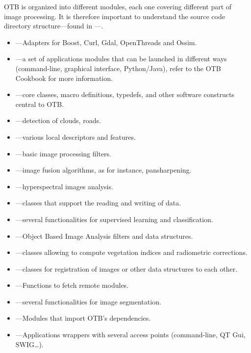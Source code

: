 OTB is organized into different modules, each one covering different part of image processing.
It is therefore important to understand the source code directory structure---found in ---.
\begin{itemize}
  \item {}---Adapters for Boost, Curl, Gdal, OpenThreads and Ossim.
  \item {}---a set of applications modules that can be launched in different ways
    (command-line, graphical interface, Python/Java), refer to the OTB Cookbook for more information.
  \item {}---core classes, macro definitions,
  typedefs, and other software constructs central to OTB.
  \item {}---detection of clouds, roads.
  \item {}---various local descriptors and features.
  \item {}---basic image processing filters.
  \item {}---image fusion algorithms, as for
  instance, pansharpening.
  \item {}---hyperspectral images analysis.
  \item {}---classes that support the reading
  and writing of data.     
  \item {}---several functionalities for
	supervised learning and classification.
  \item {}---Object Based Image Analysis filters
	and data structures.         
  \item {}---classes allowing to compute
  vegetation indices and radiometric corrections.    
  \item {}---classes for registration of images or other data structures to each other.  
  \item {}---Functions to fetch remote modules. 
  \item {}---several functionalities for image segmentation. 
  \item {}---Modules that import OTB's dependencies.
  \item {}---Applications wrappers with several access points (command-line, QT Gui, SWIG\ldots).
\end{itemize}


